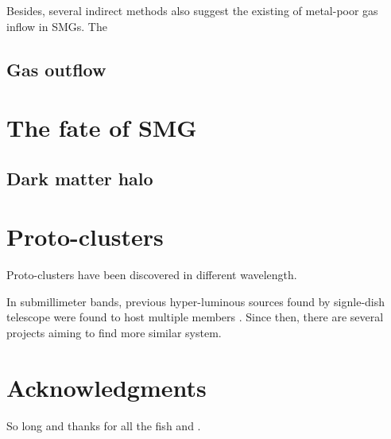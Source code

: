 \documentclass{astronotes/astronotes} %
\begin{document}
Besides, several indirect methods also suggest the existing of metal-poor gas inflow in SMGs.
The 


\subsection{Gas outflow}

\section{The fate of SMG}
\subsection{Dark matter halo}

\section{Proto-clusters}
Proto-clusters have been discovered in different wavelength. 

In submillimeter bands, previous hyper-luminous sources found by signle-dish telescope were found to host multiple members \citep{Oteo2018, Miller2018}. 
Since then, there are several projects aiming to find more similar system.

\section*{Acknowledgments} %


So long and thanks for all the fish \citet{Oteo2018} and \citet{Miller2018}.
\cite{}


%







\end{document}
